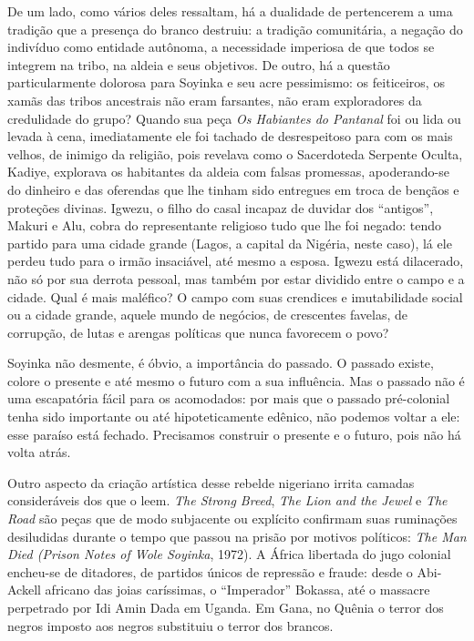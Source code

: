 \documentclass[
  letterpaper,
  DIV=11,
  numbers=noendperiod]{scrreprt}
\begin{document}
De um lado, como vários deles ressaltam, há a dualidade de pertencerem a
uma tradição que a presença do branco destruiu: a tradição comunitária,
a negação do indivíduo como entidade autônoma, a necessidade imperiosa
de que todos se integrem na tribo, na aldeia e seus objetivos. De outro,
há a questão particularmente dolorosa para Soyinka e seu acre
pessimismo: os feiticeiros, os xamãs das tribos ancestrais não eram
farsantes, não eram exploradores da credulidade do grupo? Quando sua
peça \emph{Os Habiantes do Pantanal} foi ou lida ou levada à cena,
imediatamente ele foi tachado de desrespeitoso para com os mais velhos,
de inimigo da religião, pois revelava como o Sacerdoteda Serpente
Oculta, Kadiye, explorava os habitantes da aldeia com falsas promessas,
apoderando-se do dinheiro e das oferendas que lhe tinham sido entregues
em troca de bençãos e proteções divinas. Igwezu, o filho do casal
incapaz de duvidar dos ``antigos'', Makuri e Alu, cobra do representante
religioso tudo que lhe foi negado: tendo partido para uma cidade grande
(Lagos, a capital da Nigéria, neste caso), lá ele perdeu tudo para o
irmão insaciável, até mesmo a esposa. Igwezu está dilacerado, não só por
sua derrota pessoal, mas também por estar dividido entre o campo e a
cidade. Qual é mais maléfico? O campo com suas crendices e imutabilidade
social ou a cidade grande, aquele mundo de negócios, de crescentes
favelas, de corrupção, de lutas e arengas políticas que nunca favorecem
o povo?

Soyinka não desmente, é óbvio, a importância do passado. O passado
existe, colore o presente e até mesmo o futuro com a sua influência. Mas
o passado não é uma escapatória fácil para os acomodados: por mais que o
passado pré-colonial tenha sido importante ou até hipoteticamente
edênico, não podemos voltar a ele: esse paraíso está fechado. Precisamos
construir o presente e o futuro, pois não há volta atrás.

Outro aspecto da criação artística desse rebelde nigeriano irrita
camadas consideráveis dos que o leem. \emph{The Strong Breed}, \emph{The
Lion and the Jewel} e \emph{The Road} são peças que de modo subjacente
ou explícito confirmam suas ruminações desiludidas durante o tempo que
passou na prisão por motivos políticos: \emph{The Man Died (Prison Notes
of Wole Soyinka}, 1972). A África libertada do jugo colonial encheu-se
de ditadores, de partidos únicos de repressão e fraude: desde o
Abi-Ackell africano das joias caríssimas, o ``Imperador'' Bokassa, até o
massacre perpetrado por Idi Amin Dada em Uganda. Em Gana, no Quênia o
terror dos negros imposto aos negros substituiu o terror dos brancos.
\end{document}
